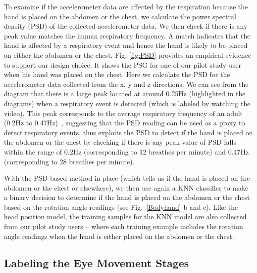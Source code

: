 To examine if the accelerometer data are affected by the respiration because the hand is placed on the abdomen or the chest, we calculate
the power spectral density (PSD) of the collected accelerometer data. We then check if there is any peak value matches the human
respiratory frequency. A match indicates that the hand is affected by a respiratory event and hence the hand is likely to be placed on
either the abdomen or the chest. Fig. \ref{fig:PSD} provides an empirical evidence to support our design choice. It shows the PSG for one
of our pilot study user when his hand was placed on the chest. Here we calculate the PSD for the accelerometer data collected from the x, y
and z directions. We can see from the diagram that there is a large peak located at around 0.25Hz (highlighted in the diagrams) when a
respiratory event is detected (which is labeled by watching the video). This peak corresponds to the average respiratory frequency of an
adult (0.2Hz to 0.47Hz)~\cite{Breath_frequence}, suggesting that the PSD reading can be used as a proxy to detect respiratory events.
\systemname thus exploits the PSD to detect if the hand is placed on the abdomen or the chest by checking if there is any peak value of PSD
falls within the range of 0.2Hz (corresponding to 12 breathes per minute) and 0.47Hz (corresponding to 28 breathes per minute).

With the PSD-based method in place (which tells us if the hand is placed on the abdomen or the chest or elsewhere), we then use again a KNN
classifier to make a binary decision to determine if the hand is placed on the abdomen or the chest based on the rotation angle readings
(see Fig.~\ref{Bodyhand} b and c). Like the head position model, the training samples for the KNN model are also collected from our pilot
study users -- where each training example includes the rotation angle readings when the hand is either placed on the abdomen or the chest.

\subsection{Labeling the Eye Movement Stages}

